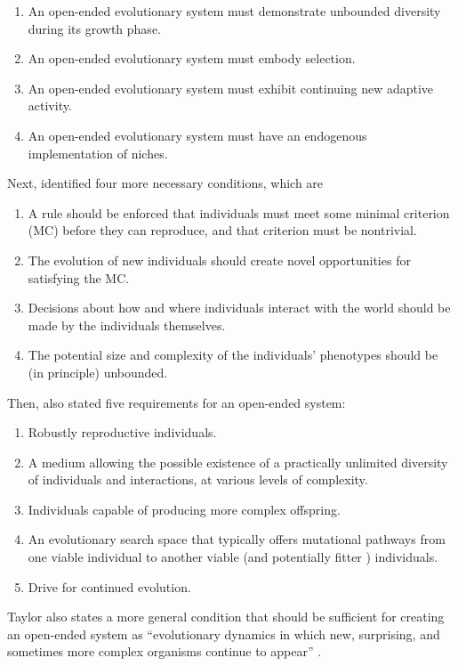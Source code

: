 \begin{enumerate}
  \item An open-ended evolutionary system must demonstrate unbounded diversity
        during its growth phase.
  \item An open-ended evolutionary system must embody selection.
  \item An open-ended evolutionary system must exhibit continuing new adaptive
        activity.
  \item An open-ended evolutionary system must have an endogenous implementation
        of niches.
\end{enumerate}
Next, \textcite{sorosIdentifyingNecessaryConditions2014} identified four more necessary
conditions, which are

\begin{enumerate}
  \item A rule should be enforced that individuals must meet some minimal
        criterion (MC) before they can reproduce, and that criterion must be
        nontrivial.
  \item The evolution of new individuals should create novel opportunities for
        satisfying the MC.
  \item Decisions about how and where individuals interact with the world should
        be made by the individuals themselves.
  \item The potential size and complexity of the individuals' phenotypes should
        be (in principle) unbounded.
\end{enumerate}
Then, \textcite{taylorRequirementsOpenEndedEvolution2015} also stated five
requirements for an open-ended system:

\begin{enumerate}
  \item Robustly reproductive individuals.
  \item A medium allowing the possible existence of a practically unlimited
        diversity of individuals and interactions, at various levels of
        complexity.
  \item Individuals capable of producing more complex offspring.
  \item An evolutionary search space that typically offers mutational pathways
        from one viable individual to another viable (and potentially fitter )
        individuals.
  \item Drive for continued evolution.
\end{enumerate}
Taylor also states a more general condition that should be sufficient for
creating an open-ended system as ``evolutionary dynamics in which new,
surprising, and sometimes more complex organisms continue to appear''
\parencite{taylorRequirementsOpenEndedEvolution2015,
  taylorOpenEndedEvolutionPerspectives2016}.

